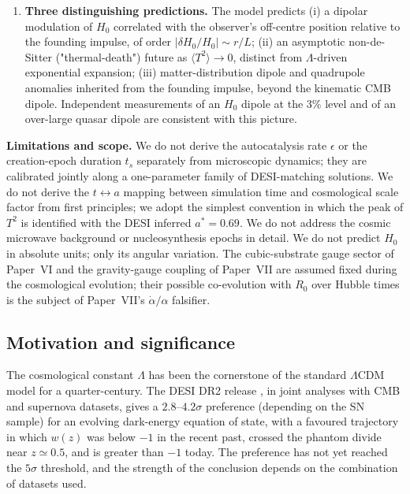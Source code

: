 \documentclass[11pt,a4paper]{article}
\begin{document}
\begin{enumerate}
\item \textbf{Three distinguishing predictions.} The model predicts
(i) a dipolar modulation of $H_0$ correlated with the observer's
off-centre position relative to the founding impulse, of order
$|\delta H_0/H_0| \sim r/L$;
(ii) an asymptotic non-de-Sitter ("thermal-death") future as
$\langle T^2\rangle \to 0$, distinct from $\Lambda$-driven exponential
expansion;
(iii) matter-distribution dipole and quadrupole anomalies inherited
from the founding impulse, beyond the kinematic CMB dipole.
Independent measurements of an $H_0$ dipole at the $3\%$ level
\cite{boubel2024} and of an over-large quasar dipole \cite{secrest2021}
are consistent with this picture.
\end{enumerate}

\textbf{Limitations and scope.}
We do not derive the autocatalysis rate $\epsilon$ or the
creation-epoch duration $t_s$ separately from microscopic dynamics;
they are calibrated jointly along a one-parameter family of
DESI-matching solutions. We do not derive the
$t \leftrightarrow a$ mapping between simulation time and cosmological
scale factor from first principles; we adopt the simplest convention
in which the peak of $T^2$ is identified with the DESI inferred
$a^\ast = 0.69$. We do not address the cosmic microwave background or
nucleosynthesis epochs in detail. We do not predict $H_0$ in absolute
units; only its angular variation. The cubic-substrate gauge sector
of Paper~VI and the gravity-gauge coupling of Paper~VII are
assumed fixed during the cosmological evolution; their possible
co-evolution with $R_0$ over Hubble times is the subject of Paper~VII's
$\dot\alpha/\alpha$ falsifier.

\subsection*{Motivation and significance}

The cosmological constant $\Lambda$ has been the cornerstone of the
standard $\Lambda$CDM model for a quarter-century. The DESI DR2 release \cite{desi2025_dr2}, in joint analyses with CMB
and supernova datasets, gives a $2.8$--$4.2\sigma$ preference
(depending on the SN sample) for an evolving dark-energy equation of
state, with a favoured trajectory in which $w(z)$ was below $-1$ in the
recent past, crossed the phantom divide near $z \simeq 0.5$, and is
greater than $-1$ today. The preference has not yet reached the $5\sigma$
threshold, and the strength of the conclusion depends on the
combination of datasets used.
\end{document}
